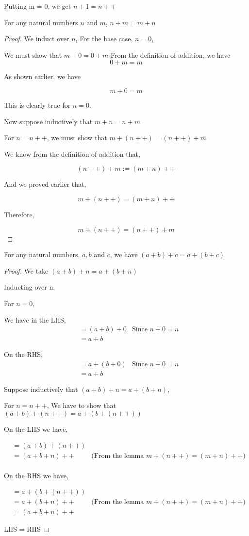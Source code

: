\documentclass[11pt]{report}
\begin{document}
Putting m = 0, we get \(n+1 = n++\)

\begin{prop}
For any natural numbers $n$ and $m$, $n+m=m+n$
\end{prop}
\begin{proof}
We induct over $n$,
For the base case, $n=0$,

We must show that $m+0 = 0+m$
From the definition of addition, we have
$$0+m = m$$

As shown earlier, we have

$$m+0 = m$$

This is clearly true for $n=0$.

Now suppose inductively that $m+n = n+m$

For $n=n++$, we must show that $m+(n++) = (n++) + m$

We know from the definition of addition that,

$$(n++) + m := (m+n)++$$

And we proved earlier that,

$$m+(n++) = (m+n)++$$

Therefore,

$$m+(n++) = (n++)+m$$
\end{proof}
\begin{prop}
For any natural numbers, $a,b$ and $c$, we have $(a+b)+c = a+(b+c)$
\end{prop}
\begin{proof}
We take $(a+b)+n = a + (b+n)$

Inducting over n,

For $n=0$,

We have in the LHS,
\begin{align*}
&=(a+b)+0 &\text{Since $n+0 = n$}\\
&=a+b
\end{align*}

On the RHS,
\begin{align*}
&=a + (b+0) &\text{Since $n+0 = n$}\\
&=a + b
\end{align*}

Suppose inductively that $(a+b)+n = a+(b+n)$,

For $n=n++$,
We have to show that $(a+b)+(n++) = a+(b+(n++))$

On the LHS we have,

\begin{align*}
&=(a+b)+(n++) \\
&=(a+b+n)++ &\text{(From the lemma $m+(n++) = (m+n)++$)} \\
\end{align*}

On the RHS we have,

\begin{align*}
&=a+(b+(n++)) \\
&=a+(b+n)++ &\text{(From the lemma $m+(n++) = (m+n)++$)} \\
&=(a+b+n)++
\end{align*}

LHS = RHS
\end{proof}
\end{document}
